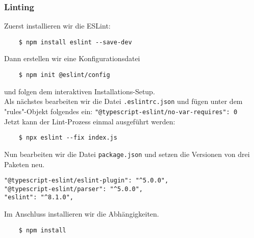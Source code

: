 \subsubsection{Linting}
Zuerst installieren wir die ESLint:

\begin{verbatim}
	$ npm install eslint --save-dev
\end{verbatim}

\noindent
Dann erstellen wir eine Konfigurationsdatei

\begin{verbatim}
	$ npm init @eslint/config
\end{verbatim}

\noindent
und folgen dem interaktiven Installations-Setup. \\

\noindent Als nächstes bearbeiten wir die Datei \verb|.eslintrc.json|
und fügen unter dem "rules"-Objekt folgendes ein:
\verb|"@typescript-eslint/no-var-requires": 0| \\

\noindent
Jetzt kann der Lint-Prozess einmal ausgeführt werden:

\begin{verbatim}
	$ npx eslint --fix index.js
\end{verbatim}

\noindent
Nun bearbeiten wir die Datei \verb|package.json| und setzen 
die Versionen von drei Paketen neu.

\begin{verbatim}
"@typescript-eslint/eslint-plugin": "^5.0.0",
"@typescript-eslint/parser": "^5.0.0",
"eslint": "^8.1.0",
\end{verbatim}

\noindent
Im Anschluss installieren wir die Abhängigkeiten.

\begin{verbatim}
	$ npm install
\end{verbatim}





